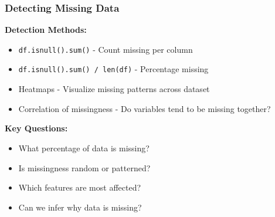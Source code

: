 \documentclass[aspectratio=169]{beamer}
\begin{document}
\begin{frame}
\frametitle{Detecting Missing Data}

\textbf{Detection Methods:}
\begin{itemize}
    \item \texttt{df.isnull().sum()} - Count missing per column
    \item \texttt{df.isnull().sum() / len(df)} - Percentage missing
    \item Heatmaps - Visualize missing patterns across dataset
    \item Correlation of missingness - Do variables tend to be missing together?
\end{itemize}

\vspace{0.5cm}

\textbf{Key Questions:}
\begin{itemize}
    \item What percentage of data is missing?
    \item Is missingness random or patterned?
    \item Which features are most affected?
    \item Can we infer why data is missing?
\end{itemize}

\end{frame}
\end{document}

